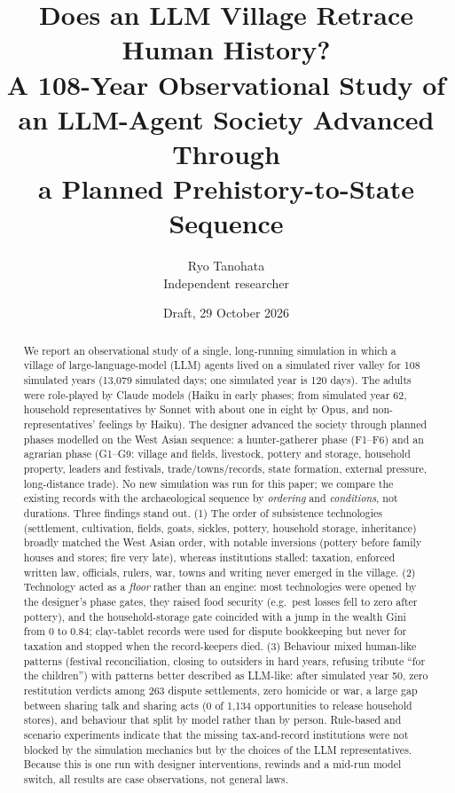 \documentclass[11pt]{article}
\title{Does an LLM Village Retrace Human History?\\[2pt]
\large A 108-Year Observational Study of an LLM-Agent Society Advanced Through\\ a Planned Prehistory-to-State Sequence}
\author{Ryo Tanohata\\ Independent researcher\\ \texttt{\todo{email}}}
\date{Draft, 29 October 2026}
\begin{document}
\maketitle

\begin{abstract}
We report an observational study of a single, long-running simulation in which a village of large-language-model (LLM) agents lived on a simulated river valley for 108 simulated years (13{,}079 simulated days; one simulated year is 120 days). The adults were role-played by Claude models (Haiku in early phases; from simulated year 62, household representatives by Sonnet with about one in eight by Opus, and non-representatives' feelings by Haiku). The designer advanced the society through planned phases modelled on the West Asian sequence: a hunter-gatherer phase (F1--F6) and an agrarian phase (G1--G9: village and fields, livestock, pottery and storage, household property, leaders and festivals, trade/towns/records, state formation, external pressure, long-distance trade). No new simulation was run for this paper; we compare the existing records with the archaeological sequence by \emph{ordering} and \emph{conditions}, not durations. Three findings stand out. (1) The order of subsistence technologies (settlement, cultivation, fields, goats, sickles, pottery, household storage, inheritance) broadly matched the West Asian order, with notable inversions (pottery before family houses and stores; fire very late), whereas institutions stalled: taxation, enforced written law, officials, rulers, war, towns and writing never emerged in the village. (2) Technology acted as a \emph{floor} rather than an engine: most technologies were opened by the designer's phase gates, they raised food security (e.g.\ pest losses fell to zero after pottery), and the household-storage gate coincided with a jump in the wealth Gini from 0 to 0.84; clay-tablet records were used for dispute bookkeeping but never for taxation and stopped when the record-keepers died. (3) Behaviour mixed human-like patterns (festival reconciliation, closing to outsiders in hard years, refusing tribute ``for the children'') with patterns better described as LLM-like: after simulated year 50, zero restitution verdicts among 263 dispute settlements, zero homicide or war, a large gap between sharing talk and sharing acts (0 of 1{,}134 opportunities to release household stores), and behaviour that split by model rather than by person. Rule-based and scenario experiments indicate that the missing tax-and-record institutions were not blocked by the simulation mechanics but by the choices of the LLM representatives. Because this is one run with designer interventions, rewinds and a mid-run model switch, all results are case observations, not general laws.
\end{abstract}
\end{document}
